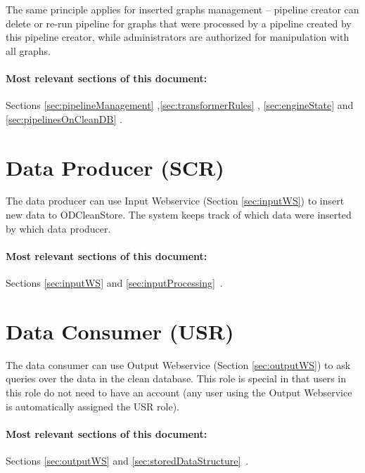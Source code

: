 	 The same principle applies for inserted graphs management -- pipeline creator can delete or re-run pipeline for graphs that were processed by a pipeline created by this pipeline creator, while administrators are authorized for manipulation with all graphs.

	\paragraph{Most relevant sections of this document:} Sections \ref{sec:pipelineManagement} ,\linebreak[4] \ref{sec:transformerRules} , \ref{sec:engineState}  and \linebreak[4] \ref{sec:pipelinesOnCleanDB} .
	
\section[Data Producer]{Data Producer (SCR)} 
\label{sec:scr}
  The data producer can use Input Webservice (Section \ref{sec:inputWS}) to insert new data to ODCleanStore. The system keeps track of which data were inserted by which data producer.

  \paragraph{Most relevant sections of this document:} Sections \ref{sec:inputWS}  and \linebreak[4] \ref{sec:inputProcessing}~.

\section[Data Consumer]{Data Consumer (USR)} 
\label{sec:usr}
  The data consumer can use Output Webservice (Section \ref{sec:outputWS}) to ask queries over the data in the clean database. This role is special in that users in this role do not need to have an account (any user using the Output Webservice is automatically assigned the USR role).

  \paragraph{Most relevant sections of this document:} Sections \ref{sec:outputWS}  and \linebreak[4] \ref{sec:storedDataStructure}~.

